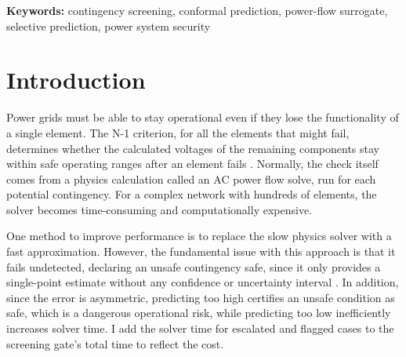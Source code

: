 \documentclass[12pt]{article}
\begin{document}
\vspace{0.15in}
\noindent\textbf{Keywords:} contingency screening, conformal prediction,
power-flow surrogate, selective prediction, power system security


\thispagestyle{empty}\newpage

\setcounter{page}{1}


\section{Introduction}
\label{sec:intro}

Power grids must be able to stay operational even if they lose the functionality of a single element. The N-1 criterion, for all the elements that might fail, determines whether the calculated voltages of the remaining components stay within safe operating ranges after an element fails \cite{nerc}. Normally, the check itself comes from a physics calculation called an AC power flow solve, run for each potential contingency. For a complex network with hundreds of elements, the solver becomes time-consuming and computationally expensive.

One method to improve performance is to replace the slow physics solver with a fast approximation. However, the fundamental issue with this approach is that it fails undetected, declaring an unsafe contingency safe, since it only provides a single-point estimate without any confidence or uncertainty interval \cite{bates2021}. In addition, since the error is asymmetric, predicting too high certifies an unsafe condition as safe, which is a dangerous operational risk, while predicting too low inefficiently increases solver time. I add the solver time for escalated and flagged cases to the screening gate's total time to reflect the cost.
\end{document}
